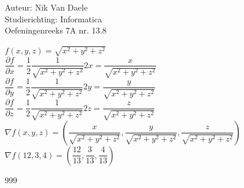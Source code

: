 \documentclass[a4paper]{article}
\begin{document}
  
\noindent \large Auteur: Nik Van Daele \\
\noindent \large Studierichting: Informatica\\
\noindent \large Oefeningenreeks 7A nr. 13.8\\

\medskip

\normalsize

$f(x, y, z) = \sqrt{x^2 + y^2 + z^2}$\\

$\dfrac{\partial f}{\partial x} = \dfrac{1}{2} \dfrac{1}{\sqrt{x^2 + y^2 + z^2}} 2x = \dfrac{x}{\sqrt{x^2 + y^2 + z^2}}$\\

$\dfrac{\partial f}{\partial y} = \dfrac{1}{2} \dfrac{1}{\sqrt{x^2 + y^2 + z^2}} 2y = \dfrac{y}{\sqrt{x^2 + y^2 + z^2}}$\\

$\dfrac{\partial f}{\partial z} = \dfrac{1}{2} \dfrac{1}{\sqrt{x^2 + y^2 + z^2}} 2z = \dfrac{z}{\sqrt{x^2 + y^2 + z^2}}$\\

$\nabla f (x, y, z) = \left(\dfrac{x}{\sqrt{x^2 + y^2 + z^2}}, \dfrac{y}{\sqrt{x^2 + y^2 + z^2}}, \dfrac{z}{\sqrt{x^2 + y^2 + z^2}}\right)$\\

$\nabla f (12, 3, 4) = \left(\dfrac{12}{13}, \dfrac{3}{13}, \dfrac{4}{13}\right)$\\

\begin{thebibliography}{999}
\end{thebibliography}
\end{document}
